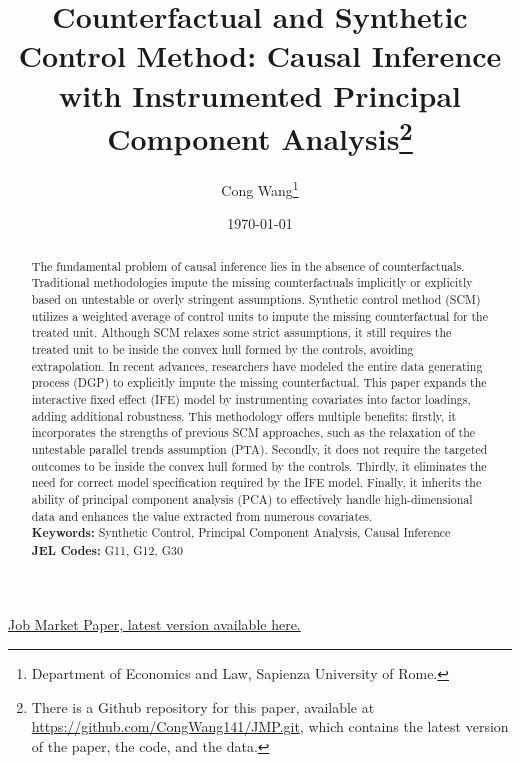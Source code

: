 \documentclass[12pt]{article}
\begin{document}
\newtheorem{assumption}{Assumption}

\begin{titlepage}
\title{Counterfactual and Synthetic Control Method: Causal Inference with Instrumented Principal Component Analysis\thanks{There is a Github repository for this paper, available at \href{https://github.com/CongWang141/JMP.git}{https://github.com/CongWang141/JMP.git}, which contains the latest version of the paper, the code, and the data.}}
\author{ Cong Wang\thanks{Department of Economics and Law, Sapienza University of Rome.}}
\date{\today}
\maketitle
\begin{center}
\href{https://github.com/CongWang141/JMP/blob/main/latex/main.pdf}{Job Market Paper, latest version available here.}
\end{center}
\begin{abstract}
\noindent The fundamental problem of causal inference lies in the absence of counterfactuals. Traditional methodologies impute the missing counterfactuals implicitly or explicitly based on untestable or overly stringent assumptions. Synthetic control method (SCM) utilizes a weighted average of control units to impute the missing counterfactual for the treated unit. Although SCM relaxes some strict assumptions, it still requires the treated unit to be inside the convex hull formed by the controls, avoiding extrapolation. In recent advances, researchers have modeled the entire data generating process (DGP) to explicitly impute the missing counterfactual. This paper expands the interactive fixed effect (IFE) model by instrumenting covariates into factor loadings, adding additional robustness. This methodology offers multiple benefits: firstly, it incorporates the strengths of previous SCM approaches, such as the relaxation of the untestable parallel trends assumption (PTA). Secondly, it does not require the targeted outcomes to be inside the convex hull formed by the controls. Thirdly, it eliminates the need for correct model specification required by the IFE model. Finally, it inherits the ability of principal component analysis (PCA) to effectively handle high-dimensional data and enhances the value extracted from numerous covariates.\\

\noindent\textbf{Keywords:} Synthetic Control, Principal Component Analysis, Causal Inference\\

\noindent\textbf{JEL Codes:} G11, G12, G30\\
\bigskip
\end{abstract}
\setcounter{page}{0}
\thispagestyle{empty}
\end{titlepage}
\pagebreak \newpage
\end{document}

